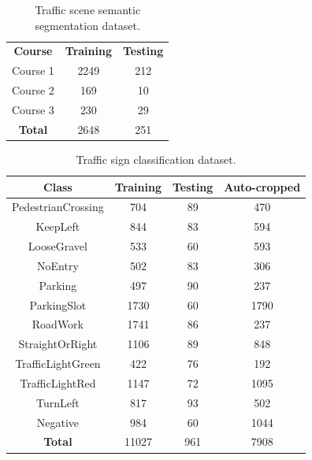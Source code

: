 \begin{table}[h]
  \begin{center}
    \caption[Traffic scene semantic segmentation dataset]{Traffic scene
      semantic segmentation dataset.}
    \label{table:semantic-segmentation-dataset}
    \begin{tabular}{|c|c|c|}
      \hline
      \textbf{Course}   & \textbf{Training} & \textbf{Testing} \\
      Course 1          & 2249              & 212              \\
      Course 2          & 169               & 10               \\
      Course 3          & 230               & 29               \\
      \hline
      \textbf{Total}    & 2648              & 251              \\
      \hline
    \end{tabular}
  \end{center}
\end{table}


\begin{table}[h]
  \begin{center}
    \caption[Traffic sign classification dataset]{Traffic sign classification
      dataset.}
    \label{table:classification-dataset}
    \begin{tabular}{|c|c|c|c|}
      \hline
      \textbf{Class}     & \textbf{Training} & \textbf{Testing} & \textbf{Auto-cropped} \\
      \hline
      PedestrianCrossing & 704               & 89               & 470 \\
      KeepLeft           & 844               & 83               & 594 \\
      LooseGravel        & 533               & 60               & 593\\
      NoEntry            & 502               & 83               & 306 \\
      Parking            & 497               & 90               & 237 \\
      ParkingSlot        & 1730              & 60               & 1790 \\
      RoadWork           & 1741              & 86               & 237 \\
      StraightOrRight    & 1106              & 89               & 848 \\
      TrafficLightGreen  & 422               & 76               & 192 \\
      TrafficLightRed    & 1147              & 72               & 1095 \\
      TurnLeft           & 817               & 93               & 502 \\
      Negative           & 984               & 60               & 1044 \\
      \hline
      \textbf{Total}     & 11027             & 961              & 7908 \\
      \hline
    \end{tabular}
  \end{center}
\end{table}

